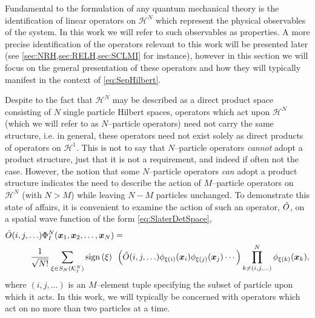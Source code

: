 Fundamental to the formulation of any quantum mechanical theory is the identification of linear operators on $\mathcal{H}^N$
which represent the physical observables of the system. In this work we will refer to such observables as properties. A
more precise identification of the operators relevant to this work will be presented later 
(see \cref{sec:NRH,sec:RELH,sec:SCLMI} for instance), however in this section we will focus on the general presentation
of these operators and how they will typically manifest in the context of \cref{eq:SepHilbert}. 

Despite to the fact that $\mathcal{H}^N$ may be described as a direct product space consisting of $N$ single particle
Hilbert spaces, operators which act upon $\mathcal{H}^N$ (which we will refer to as $N$--particle operators) need not carry the same structure, 
i.e. in general, these operators need not exist solely as direct products of operators on $\mathcal{H}^1$. This is not to say
that $N$--particle operators \emph{cannot} adopt a product structure, just that it is not a requirement, and indeed
if often not the case. However, the notion that some $N$--particle operators \emph{can} adopt a product structure indicates the need
to describe the action of $M$--particle operators on $\mathcal{H}^N$ (with $N>M$) while leaving $N-M$ particles unchanged.
To demonstrate this state of affairs, it is convenient to examine the action of such an operator, $\hat{O}$, on a 
spatial wave function of the form \cref{eq:SlaterDetSpace},
\begin{align}
  \label{eq:MOpSpace}
  &\hat{O}(i,j,\ldots) \Phi_I^N(\boldsymbol{x}_1,\boldsymbol{x}_2,\ldots,\boldsymbol{x}_N) = \nonumber \\ &\qquad \quad
    \frac{1}{\sqrt{N!}} \sum_{\xi \in S_N(\mathcal{K}^N_I)} \mathrm{sign}\left( \xi \right) \text{ } 
    \left(\hat{O}(i,j,\ldots) \phi_{\xi(i)}(\boldsymbol{x}_i)\phi_{\xi(j)}(\boldsymbol{x}_j)\cdots\right)
    \prod_{k \neq (i,j,\ldots) }^{N} \phi_{\xi(k)}(\boldsymbol{x}_k),
\end{align}
where $(i,j,\ldots)$ is an $M$--element tuple specifying the subset of particle upon which it acts.
In this work, we will typically be concerned with operators which act on no more than two particles at a time.


